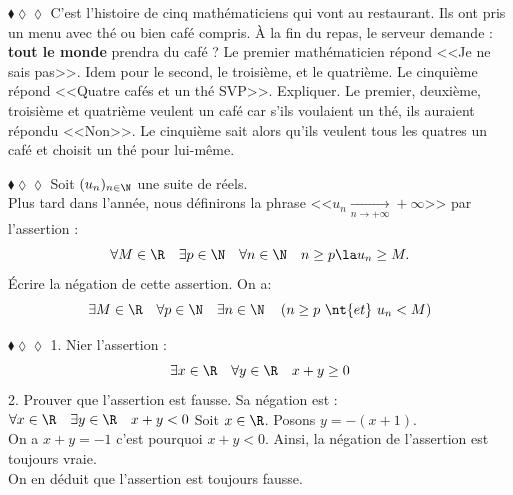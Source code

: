 \documentclass[11pt]{article}
\begin{document}
\begin{exercice}{$\blacklozenge\lozenge\lozenge$}{}
    C'est l'histoire de cinq mathématiciens qui vont au restaurant. Ils ont pris un menu avec thé ou bien café compris. À la fin du repas, le serveur demande : \textbf{tout le monde} prendra du café ? Le premier mathématicien répond <<Je ne sais pas>>. Idem pour le second, le troisième, et le quatrième. Le cinquième répond <<Quatre cafés et un thé SVP>>. Expliquer.
    \tcblower
    Le premier, deuxième, troisième et quatrième veulent un café car s'ils voulaient un thé, ils auraient répondu <<Non>>. Le cinquième sait alors qu'ils veulent tous les quatres un café et choisit un thé pour lui-même. 
\end{exercice}

\vspace*{-0.8cm}

\begin{exercice}{$\blacklozenge\lozenge\lozenge$}{}
    Soit $(u_n)_{n\in\N}$ une suite de réels.\\
    Plus tard dans l'année, nous définirons la phrase <<$u_n\xrightarrow[n\to+\infty]{}+\infty$>> par l'assertion :
    \begin{equation*}
        \forall M \in \R \quad \exists p \in \N \quad \forall n \in \N \quad n \geq p \la u_n\geq M.
    \end{equation*}
    Écrire la négation de cette assertion.
    \tcblower
    On a:
    \begin{equation*}
        \exists M \in \R \quad \forall p \in \N \quad \exists n \in \N \quad \left(n \geq p ~ \nt{ et } ~ u_n<M\right)
    \end{equation*}
\end{exercice}

\begin{exercice}{$\blacklozenge\lozenge\lozenge$}{}
    1. Nier l'assertion :
    \begin{equation*}
        \exists x \in \R \quad \forall y \in \R \quad x+y \geq 0
    \end{equation*}
    2. Prouver que l'assertion est fausse.
    \tcblower
     Sa négation est : $\forall x \in \R \quad \exists y \in \R \quad x+y<0$
     Soit $x \in \R$. Posons $y=-(x+1)$.\\
    On a $x+y=-1$ c'est pourquoi $x+y<0$. Ainsi, la négation de l'assertion est toujours vraie.\\
    On en déduit que l'assertion est toujours fausse.
\end{exercice}
\end{document}
